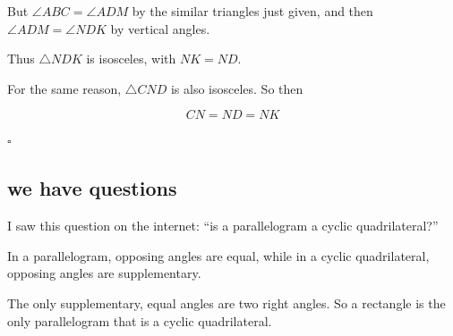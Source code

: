 \documentclass[11pt, oneside]{article}
\begin{document}
But $\angle ABC = \angle ADM$ by the similar triangles just given, and then $\angle ADM = \angle NDK$ by vertical angles.

Thus $\triangle NDK$ is isosceles, with $NK = ND$.

For the same reason, $\triangle CND$ is also isosceles.  So then

\[ CN = ND = NK \]

$\square$

\subsection*{we have questions}

I saw this question on the internet:  ``is a parallelogram a cyclic quadrilateral?''

In a parallelogram, opposing angles are equal, while in a cyclic quadrilateral, opposing angles are supplementary.

The only supplementary, equal angles are two right angles.  So a rectangle is the only parallelogram that is a cyclic quadrilateral.
\end{document}

